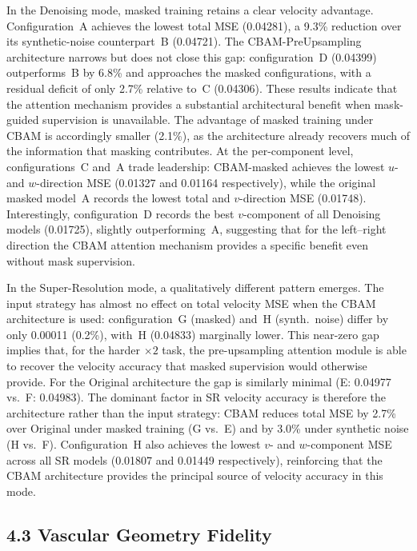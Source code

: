 In the Denoising mode, masked training retains a clear velocity advantage.  Configuration~A
achieves the lowest total MSE (0.04281), a 9.3\% reduction over its synthetic-noise counterpart~B
(0.04721).  The CBAM-PreUpsampling architecture narrows but does not close this gap:
configuration~D (0.04399) outperforms~B by 6.8\% and approaches the masked configurations, with
a residual deficit of only 2.7\% relative to~C (0.04306).  These results indicate that the
attention mechanism provides a substantial architectural benefit when mask-guided supervision is
unavailable.  The advantage of masked training under CBAM is accordingly smaller (2.1\%), as the
architecture already recovers much of the information that masking contributes.  At the
per-component level, configurations~C and~A trade leadership: CBAM-masked achieves the lowest
$u$- and $w$-direction MSE (0.01327 and 0.01164 respectively), while the original masked model~A
records the lowest total and $v$-direction MSE (0.01748).  Interestingly, configuration~D records
the best $v$-component of all Denoising models (0.01725), slightly outperforming~A, suggesting
that for the left--right direction the CBAM attention mechanism provides a specific benefit even
without mask supervision.

In the Super-Resolution mode, a qualitatively different pattern emerges.  The input strategy has
almost no effect on total velocity MSE when the CBAM architecture is used: configuration~G
(masked) and~H (synth.\ noise) differ by only 0.00011 (0.2\%), with~H (0.04833) marginally
lower.  This near-zero gap implies that, for the harder $\times 2$ task, the pre-upsampling
attention module is able to recover the velocity accuracy that masked supervision would otherwise
provide.  For the Original architecture the gap is similarly minimal (E: 0.04977 vs.\ F:
0.04983).  The dominant factor in SR velocity accuracy is therefore the architecture rather than
the input strategy: CBAM reduces total MSE by 2.7\% over Original under masked training (G vs.\ E)
and by 3.0\% under synthetic noise (H vs.\ F).  Configuration~H also achieves the lowest
$v$- and $w$-component MSE across all SR models (0.01807 and 0.01449 respectively), reinforcing
that the CBAM architecture provides the principal source of velocity accuracy in this mode.

\subsection*{4.3 Vascular Geometry Fidelity}


